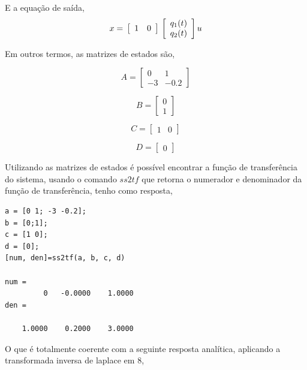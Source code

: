 \documentclass[paper=a4, fontsize=11pt]{article}
\begin{document}
\begin{list}{\textbf{Questão .}}{
\setlength{\labelwidth}{-2mm} \setlength{\parsep}{0mm}
\setlength{\topsep}{0mm} \setlength{\leftmargin}{0mm}}
		E a equação de saída,
        \begin{equation}
          x = \\
          \left[\begin{array}{rr}
          1 & 0
          \end{array}\right] \\
          \left[\begin{array}{c}
          q_1(t) \\
          q_2(t)
          \end{array}\right] u
		\end{equation}
        
        
        Em outros termos, as matrizes de estados são,
        
        $$
        A =\left[\begin{array}{rr}
          0 & 1 \\
          -3 & -0.2
          \end{array}\right]
        $$
        
        $$
        B = \left[\begin{array}{r}
          0 \\
          1
          \end{array}\right]
        $$
        
        $$
        C = \left[\begin{array}{rr}
          1 & 0
          \end{array}\right]
        $$
        
        $$
        D = \left[\begin{array}{r}
        0 
        \end{array}\right]
        $$ 
        
        Utilizando as matrizes de estados é possível encontrar
        a função de transferência do sistema, usando o comando       
        $ss2tf$ que retorna o numerador e denominador da função
        de transferência, tenho como resposta,
        
        
		\begin{lstlisting}
a = [0 1; -3 -0.2];
b = [0;1];
c = [1 0];
d = [0];
[num, den]=ss2tf(a, b, c, d)

num = 
         0   -0.0000    1.0000
den =

    1.0000    0.2000    3.0000
		\end{lstlisting}   
        
        O que é totalmente coerente com a seguinte resposta 
        analítica, aplicando a transformada
        inversa de laplace em 8,
        

\end{list}
\end{document}
